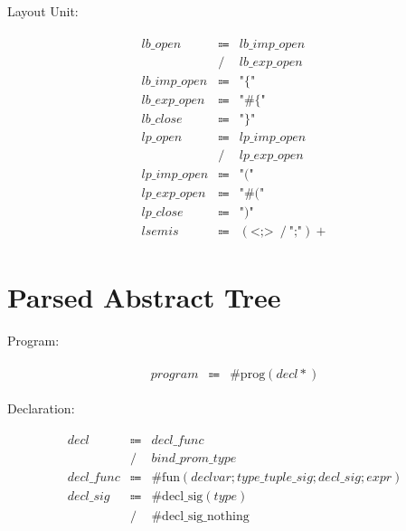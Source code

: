 Layout Unit:

\begin{align*}
    \begin{array}{rcll}
        \mathit{lb\_open}
        &\Coloneq &\mathit{lb\_imp\_open} \\
        &\mathrel{/} &\mathit{lb\_exp\_open} \\
        \mathit{lb\_imp\_open}
        &\Coloneq &\texttt{"\{"} \\
        \mathit{lb\_exp\_open}
        &\Coloneq &\texttt{"\#\{"} \\
        \mathit{lb\_close}
        &\Coloneq &\texttt{"\}"} \\
        \mathit{lp\_open}
        &\Coloneq &\mathit{lp\_imp\_open} \\
        &\mathrel{/} &\mathit{lp\_exp\_open} \\
        \mathit{lp\_imp\_open}
        &\Coloneq &\texttt{"("} \\
        \mathit{lp\_exp\_open}
        &\Coloneq &\texttt{"\#("} \\
        \mathit{lp\_close}
        &\Coloneq &\texttt{")"} \\
        \mathit{lsemis}
        &\Coloneq &(\texttt{<;>}\; \mathrel{/} \texttt{";"}){+}
    \end{array}
\end{align*}

\section{Parsed Abstract Tree}

Program:

\begin{align*}
    \begin{array}{rcll}
        \mathit{program}
        &\Coloneq &\mathrm{\#prog}(\mathit{decl}*)
    \end{array}
\end{align*}

Declaration:

\begin{align*}
    \begin{array}{rcll}
        \mathit{decl}
        &\Coloneq &\mathit{decl\_func} \\
        &\mathrel{/} &\mathit{bind\_prom\_type} \\
        \mathit{decl\_func}
        &\Coloneq &\mathrm{\#fun}(\mathit{declvar}; \mathit{type\_tuple\_sig}; \mathit{decl\_sig}; \mathit{expr}) \\
        \mathit{decl\_sig}
        &\Coloneq &\mathrm{\#decl\_sig}(\mathit{type}) \\
        &\mathrel{/} &\mathrm{\#decl\_sig\_nothing}
    \end{array}
\end{align*}

